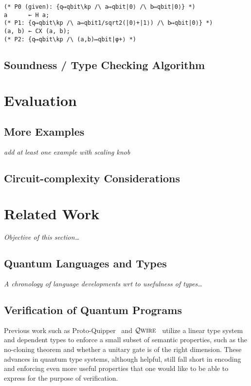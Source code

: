 \documentclass[acmsmall,nonacm,timestamp]{acmart}
\newcommand{\qwire}{\ensuremath{\mathcal{Q}\textsc{wire}}\xspace}
\begin{document}
\begin{lstlisting}
(* P0 (given): {q↦qbit\kp /\ a↦qbit|0⟩ /\ b↦qbit|0⟩} *)
a      ← H a;
(* P1: {q↦qbit\kp /\ a↦qbit1/sqrt2(|0⟩+|1⟩) /\ b↦qbit|0⟩} *)
(a, b) ← CX (a, b);
(* P2: {q↦qbit\kp /\ (a,b)↦qbit|φ+⟩ *)
\end{lstlisting}

\subsection{Soundness / Type Checking Algorithm}

\section{Evaluation}

\subsection{More Examples}
\textit{add at least one example with scaling knob}

\subsection{Circuit-complexity Considerations}

\section{Related Work}
\textit{Objective of this section\ldots}

\subsection{Quantum Languages and Types}
\textit{A chronology of language developments wrt to usefulness of types\ldots}

\subsection{Verification of Quantum Programs}
Previous work such as Proto-Quipper~\cite{ross_algebraic_2015,mahmoud_formalization_2019,rios_categorical_2017} and \qwire~\cite{paykin_qwire:_2017,rand_qwire_2017,rand_formally_2018} utilize a linear type system and dependent types to enforce a small subset of semantic properties, such as the no-cloning theorem and whether a unitary gate is of the right dimension. These advances in quantum type systems, although helpful, still fall short in encoding and enforcing even more useful properties that one would like to be able to express for the purpose of verification.
\end{document}
